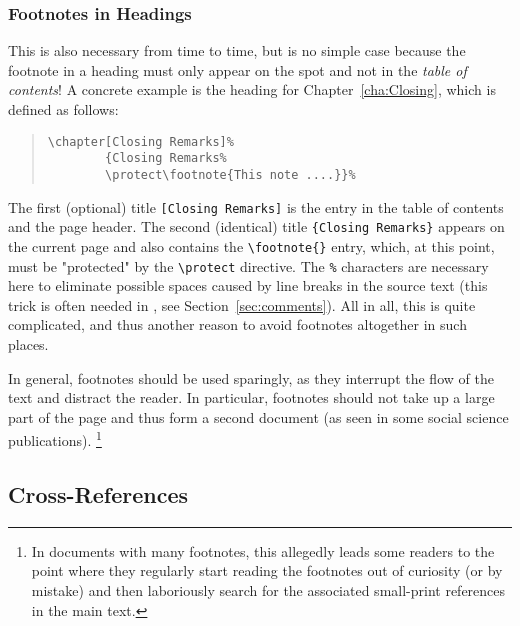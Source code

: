 \subsubsection{Footnotes in Headings}

This is also necessary from time to time, but is no simple case because the
footnote in a heading must only appear on the spot and not in the \emph{table
of contents}! A concrete example is the heading for Chapter~\ref{cha:Closing},
which is defined as follows:
%
\begin{quote}
    \begin{verbatim}
\chapter[Closing Remarks]%
        {Closing Remarks%
        \protect\footnote{This note ....}}%
    \end{verbatim}
\end{quote}
%
The first (optional) title \verb![Closing Remarks]! is the entry in the table of
contents and the page header. The second (identical) title \texttt{\{Closing
Remarks\}} appears on the current page and also contains the \verb!\footnote{}!
entry, which, at this point, must be "protected" by the \verb!\protect!
directive. The \verb!%! characters are necessary here to eliminate possible
spaces caused by line breaks in the source text (this trick is often needed in
\latex, see Section~\ref{sec:comments}). All in all, this is quite complicated,
and thus another reason to avoid footnotes altogether in such places.

In general, footnotes should be used sparingly, as they interrupt the flow of
the text and distract the reader. In particular, footnotes should not take up a
large part of the page and thus form a second document (as seen in some social
science publications).%
\footnote{In documents with many footnotes, this allegedly leads some readers to
the point where they regularly start reading the footnotes out of curiosity (or
by mistake) and then laboriously search for the associated small-print
references in the main text.}

\subsection{Cross-References}
\label{sec:cross-references}

